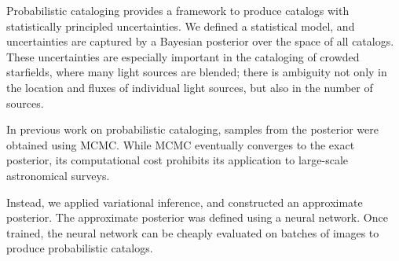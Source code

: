 Probabilistic cataloging provides a framework to 
produce catalogs with statistically principled uncertainties. We defined a statistical model, and uncertainties are captured by a Bayesian posterior over the space of all catalogs. 
These uncertainties are especially important in the cataloging of crowded starfields, where many light sources are blended; there is ambiguity not only in the location and fluxes of individual light sources, but also in the number of sources. 

In previous work on probabilistic cataloging, samples from the posterior were obtained using MCMC. While MCMC eventually converges to the exact posterior, its computational cost prohibits its application to large-scale astronomical surveys. 

Instead, we applied variational inference, and constructed an approximate posterior. The approximate posterior was defined using a neural network. Once trained, the neural network can be cheaply evaluated on batches of images to produce probabilistic catalogs. 